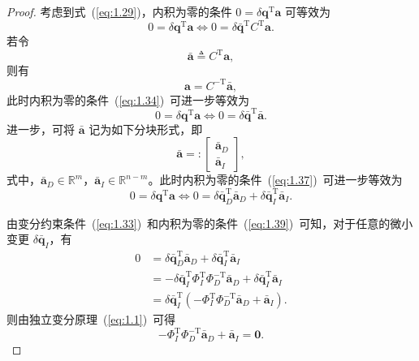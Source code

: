 \begin{proof}
考虑到式~(\ref{eq:1.29})，内积为零的条件 $0 = \delta\boldsymbol{q}^{\mathrm{T}} \boldsymbol{a}$ 可等效为
\begin{equation}\label{eq:1.34}
0 = \delta\boldsymbol{q}^{\mathrm{T}} \boldsymbol{a} \iff 0 = \delta\bar{\boldsymbol{q}}^{\mathrm{T}} C^{\mathrm{T}} \boldsymbol{a}.
\end{equation}
若令
\begin{equation}\label{eq:1.35}
\bar{\boldsymbol{a}} \triangleq C^{\mathrm{T}} \boldsymbol{a},
\end{equation}
则有
\begin{equation}\label{eq:1.36}
\boldsymbol{a} = C^{-\mathrm{T}} \bar{\boldsymbol{a}},
\end{equation}
此时内积为零的条件~(\ref{eq:1.34})~可进一步等效为
\begin{equation}\label{eq:1.37}
0 = \delta\boldsymbol{q}^{\mathrm{T}} \boldsymbol{a} \iff 0 = \delta\bar{\boldsymbol{q}}^{\mathrm{T}} \bar{\boldsymbol{a}}.
\end{equation}
进一步，可将 $\bar{\boldsymbol{a}}$ 记为如下分块形式，即
\begin{equation}\label{eq:1.38}
\bar{\boldsymbol{a}} =: \begin{bmatrix} \bar{\boldsymbol{a}}_D \\ \bar{\boldsymbol{a}}_I \end{bmatrix},
\end{equation}
式中，$\bar{\boldsymbol{a}}_D \in \mathbb{R}^m$，$\bar{\boldsymbol{a}}_I \in \mathbb{R}^{n-m}$。此时内积为零的条件~(\ref{eq:1.37})~可进一步等效为
\begin{equation}\label{eq:1.39}
0 = \delta\boldsymbol{q}^{\mathrm{T}} \boldsymbol{a} \iff 0 = \delta\bar{\boldsymbol{q}}_D^{\mathrm{T}} \bar{\boldsymbol{a}}_D + \delta\bar{\boldsymbol{q}}_I^{\mathrm{T}} \bar{\boldsymbol{a}}_I.
\end{equation}

由变分约束条件~(\ref{eq:1.33})~和内积为零的条件~(\ref{eq:1.39})~可知，对于任意的微小变更 $\delta\bar{\boldsymbol{q}}_I$，有
\begin{equation}\label{eq:1.40}
\begin{aligned}
0 &= \delta\bar{\boldsymbol{q}}_D^{\mathrm{T}} \bar{\boldsymbol{a}}_D + \delta\bar{\boldsymbol{q}}_I^{\mathrm{T}} \bar{\boldsymbol{a}}_I \\
&= -\delta\bar{\boldsymbol{q}}_I^{\mathrm{T}} \Phi_I^{\mathrm{T}} \Phi_D^{-\mathrm{T}} \bar{\boldsymbol{a}}_D + \delta\bar{\boldsymbol{q}}_I^{\mathrm{T}} \bar{\boldsymbol{a}}_I \\
&= \delta\bar{\boldsymbol{q}}_I^{\mathrm{T}} \!\left( -\Phi_I^{\mathrm{T}} \Phi_D^{-\mathrm{T}} \bar{\boldsymbol{a}}_D + \bar{\boldsymbol{a}}_I \right).
\end{aligned}
\end{equation}
则由独立变分原理~(\ref{eq:1.1})~可得
\begin{equation}\label{eq:1.41}
-\Phi_I^{\mathrm{T}} \Phi_D^{-\mathrm{T}} \bar{\boldsymbol{a}}_D + \bar{\boldsymbol{a}}_I = \boldsymbol{0}.
\end{equation}


\end{proof}
